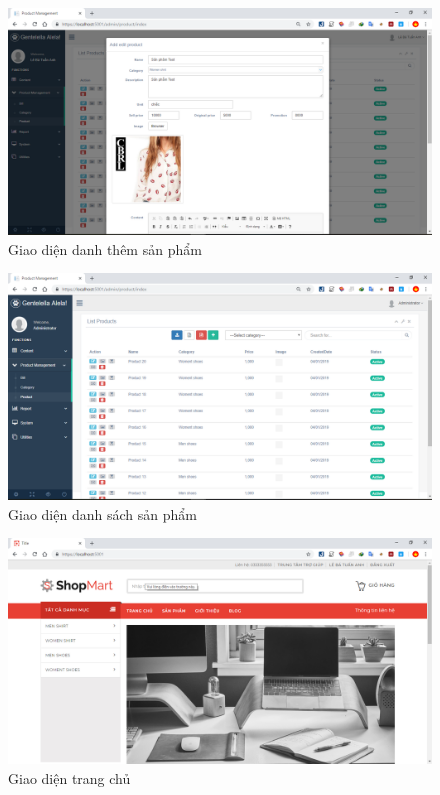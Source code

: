  \begin{center}
    \begin{figure}[h]
    \begin{center}
     \includegraphics[scale=0.45]{image/themSanPham}
    \end{center}
    \caption{Giao diện danh thêm sản phẩm}
    \label{refhinh4_4}
    \end{figure}
\end{center}

\begin{center}
    \begin{figure}[h]
    \begin{center}
     \includegraphics[scale=0.45]{image/danhsachSP}
    \end{center}
    \caption{Giao diện danh sách sản phẩm}
    \label{refhinh4_5}
    \end{figure}
\end{center}

\begin{center}
    \begin{figure}[h]
    \begin{center}
     \includegraphics[scale=0.45]{image/trangchu}
    \end{center}
    \caption{Giao diện trang chủ}
    \label{refhinh4_6}
    \end{figure}
\end{center}




